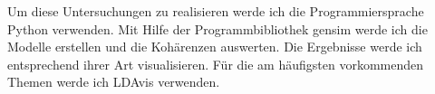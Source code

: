 Um diese Untersuchungen zu realisieren werde ich die Programmiersprache Python verwenden. Mit Hilfe der Programmbibliothek gensim \parencite[vgl.][]{rehurek_lrec} werde ich die Modelle erstellen und die Kohärenzen auswerten. Die Ergebnisse werde ich entsprechend ihrer Art visualisieren. Für die am häufigsten vorkommenden Themen werde ich LDAvis verwenden. \parencite[vgl.][]{sievert-shirley-2014-ldavis}













